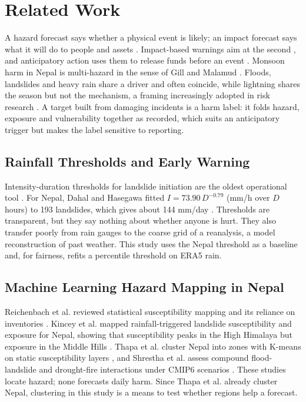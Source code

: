 \documentclass[conference]{IEEEtran}
\begin{document}
\section{Related Work}
A hazard forecast says whether a physical event is likely; an impact forecast says what it will do to people and assets \cite{Merz2020}. Impact-based warnings aim at the second \cite{Potter2025}, and anticipatory action uses them to release funds before an event \cite{CoughlanDePerez2015}. Monsoon harm in Nepal is multi-hazard in the sense of Gill and Malamud \cite{GillMalamud2014}. Floods, landslides and heavy rain share a driver and often coincide, while lightning shares the season but not the mechanism, a framing increasingly adopted in risk research \cite{Zscheischler2018,Ward2022,Ferrario2026,Jager2025}. A target built from damaging incidents is a harm label: it folds hazard, exposure and vulnerability together as recorded, which suits an anticipatory trigger but makes the label sensitive to reporting.

\subsection{Rainfall Thresholds and Early Warning}
Intensity-duration thresholds for landslide initiation are the oldest operational tool \cite{Guzzetti2008,Segoni2018,Guzzetti2020}. For Nepal, Dahal and Hasegawa fitted $I = 73.90\,D^{-0.79}$ (mm/h over $D$ hours) to 193 landslides, which gives about 144 mm/day \cite{Dahal2008,Dahal2008Erratum}. Thresholds are transparent, but they say nothing about whether anyone is hurt. They also transfer poorly from rain gauges to the coarse grid of a reanalysis, a model reconstruction of past weather. This study uses the Nepal threshold as a baseline and, for fairness, refits a percentile threshold on ERA5 rain.

\subsection{Machine Learning Hazard Mapping in Nepal}
Reichenbach et al. reviewed statistical susceptibility mapping and its reliance on inventories \cite{Reichenbach2018}. Kincey et al. mapped rainfall-triggered landslide susceptibility and exposure for Nepal, showing that susceptibility peaks in the High Himalaya but exposure in the Middle Hills \cite{Kincey2024,Kincey2023Data}. Thapa et al. cluster Nepal into zones with K-means on static susceptibility layers \cite{Thapa2026}, and Shrestha et al. assess compound flood-landslide and drought-fire interactions under CMIP6 scenarios \cite{Shrestha2026}. These studies locate hazard; none forecasts daily harm. Since Thapa et al. already cluster Nepal, clustering in this study is a means to test whether regions help a forecast.
\end{document}
